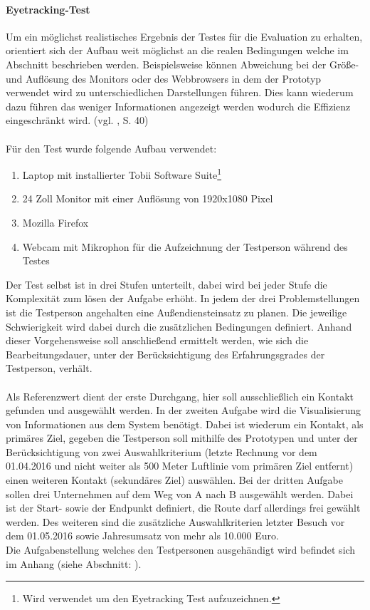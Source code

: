 \documentclass[Bachelorarbeit.tex]{subfiles}
\begin{document}
\paragraph{Eyetracking-Test}
Um ein möglichst realistisches Ergebnis der Testes für die Evaluation zu erhalten, orientiert sich der Aufbau weit möglichst an die realen Bedingungen welche im Abschnitt  beschrieben werden.
Beispielsweise können Abweichung bei der Größe- und Auflösung des Monitors oder des Webbrowsers in dem der Prototyp verwendet wird zu unterschiedlichen Darstellungen führen. 
Dies kann wiederum dazu führen das weniger Informationen angezeigt werden wodurch die Effizienz eingeschränkt wird. (vgl. \cite{Ollermann2007}, S. 40)\\
\\
Für den Test wurde folgende Aufbau verwendet:
\begin{enumerate}
	\item Laptop mit installierter Tobii Software Suite\footnote{Wird verwendet um den Eyetracking Test aufzuzeichnen.}
	\item 24 Zoll Monitor mit einer Auflösung von 1920x1080 Pixel
	\item Mozilla Firefox
	\item Webcam mit Mikrophon für die Aufzeichnung der Testperson während des Testes
\end{enumerate}

Der Test selbst ist in drei Stufen unterteilt, dabei wird bei jeder Stufe die Komplexität zum lösen der Aufgabe erhöht. 
In jedem der drei Problemstellungen ist die Testperson angehalten eine Außendiensteinsatz zu planen. 
Die jeweilige Schwierigkeit wird dabei durch die zusätzlichen Bedingungen definiert.
Anhand dieser Vorgehensweise soll anschließend ermittelt werden, wie sich die Bearbeitungsdauer, unter der Berücksichtigung des Erfahrungsgrades der Testperson, verhält. \\
\\
Als Referenzwert dient der erste Durchgang, hier soll ausschließlich ein Kontakt gefunden und ausgewählt werden. 
In der zweiten Aufgabe wird die Visualisierung von Informationen aus dem System benötigt. 
Dabei ist wiederum ein Kontakt, als primäres Ziel, gegeben die Testperson soll mithilfe des Prototypen und unter der Berücksichtigung von zwei Auswahlkriterium (letzte Rechnung vor dem 01.04.2016 und nicht weiter als 500 Meter Luftlinie vom primären Ziel entfernt) einen weiteren Kontakt (sekundäres Ziel) auswählen. 
Bei der dritten Aufgabe sollen drei Unternehmen auf dem Weg von A nach B ausgewählt werden.
Dabei ist der Start- sowie der Endpunkt definiert, die Route darf allerdings frei gewählt werden. 
Des weiteren sind die zusätzliche Auswahlkriterien letzter Besuch vor dem 01.05.2016 sowie Jahresumsatz von mehr als 10.000 Euro.
\\
Die Aufgabenstellung welches den Testpersonen ausgehändigt wird befindet sich im Anhang (siehe Abschnitt: ).
\end{document}
